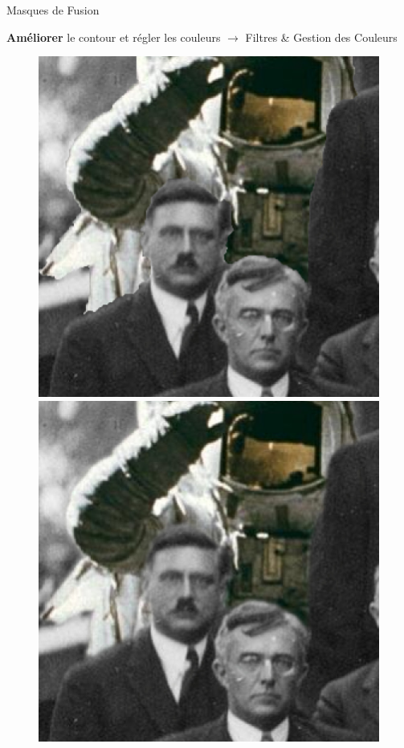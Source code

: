 \documentclass[10pt,svgnames,usenames,table]{beamer}
\begin{document}
\begin{frame}{Masques de Fusion}
\begin{overprint}
\begin{enumerate}
{		\item[4.] \textbf{Améliorer} le contour et régler les couleurs $\rightarrow$ Filtres \& Gestion des Couleurs
			\begin{figure}
		\centering
			\begin{minipage}{.5\textwidth}
				\includegraphics[width=.9\textwidth]{Images/mask/mask8}
			\end{minipage}%
			\begin{minipage}{.5\textwidth}
				\includegraphics[width=.9\textwidth]{Images/mask/mask8_2}
			\end{minipage}
		\end{figure}
	}

	
	
	
	
		\end{enumerate}	

	\end{overprint}
	\end{frame}
\end{document}
